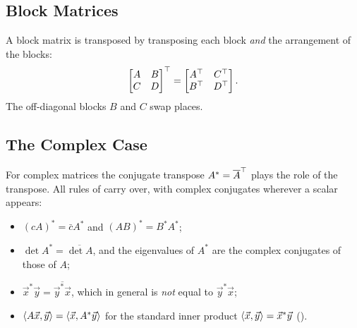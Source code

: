 \subsection{Block Matrices}

A block matrix is transposed by transposing each block \emph{and} the arrangement of the blocks:
\begin{equation}
  \begin{bmatrix} A & B \\ C & D \end{bmatrix}^\top = \begin{bmatrix} A^\top & C^\top \\ B^\top & D^\top \end{bmatrix}.
\end{equation}
The off-diagonal blocks $B$ and $C$ swap places.

\subsection{The Complex Case}

For complex matrices the conjugate transpose $A^\ast = \overline{A}^\top$ plays the role of the transpose. All rules of  carry over, with complex conjugates wherever a scalar appears:
\begin{itemize}
  \item $(cA)^\ast = \bar{c}A^\ast$ and $(AB)^\ast = B^\ast A^\ast$;
  \item $\det A^\ast = \overline{\det A}$, and the eigenvalues of $A^\ast$ are the complex conjugates of those of $A$;
  \item $\vec{x}^\ast\vec{y} = \overline{\vec{y}^\ast\vec{x}}$, which in general is \emph{not} equal to $\vec{y}^\ast\vec{x}$;
  \item $\left\langle A\vec{x}, \vec{y} \right\rangle = \left\langle \vec{x}, A^\ast\vec{y} \right\rangle$ for the standard inner product $\left\langle \vec{x}, \vec{y} \right\rangle = \vec{x}^\ast\vec{y}$ ().
\end{itemize}

